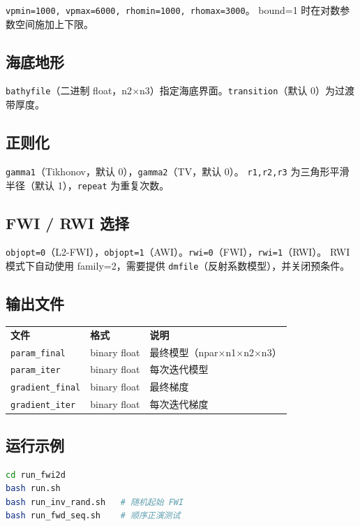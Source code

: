 \documentclass[11pt,a4paper]{ctexart}
\begin{document}
\texttt{vpmin=1000, vpmax=6000, rhomin=1000, rhomax=3000}。
bound=1 时在对数参数空间施加上下限。

\subsection{海底地形}

\texttt{bathyfile}（二进制 float，n2$\times$n3）指定海底界面。\texttt{transition}（默认 0）为过渡带厚度。

\subsection{正则化}

\texttt{gamma1}（Tikhonov，默认 0），\texttt{gamma2}（TV，默认 0）。
\texttt{r1,r2,r3} 为三角形平滑半径（默认 1），\texttt{repeat} 为重复次数。

\subsection{FWI / RWI 选择}

\texttt{objopt=0}（L2-FWI），\texttt{objopt=1}（AWI）。\texttt{rwi=0}（FWI），\texttt{rwi=1}（RWI）。
RWI 模式下自动使用 family=2，需要提供 \texttt{dmfile}（反射系数模型），并关闭预条件。

\subsection{输出文件}

\begin{tabular}{llp{5cm}}
\textbf{文件} & \textbf{格式} & \textbf{说明} \\
\texttt{param\_final} & binary float & 最终模型（npar$\times$n1$\times$n2$\times$n3）\\
\texttt{param\_iter} & binary float & 每次迭代模型 \\
\texttt{gradient\_final} & binary float & 最终梯度 \\
\texttt{gradient\_iter} & binary float & 每次迭代梯度 \\
\end{tabular}

\subsection{运行示例}

\begin{lstlisting}[language=bash]
cd run_fwi2d
bash run.sh
bash run_inv_rand.sh   # 随机起始 FWI
bash run_fwd_seq.sh    # 顺序正演测试
\end{lstlisting}
\end{document}
